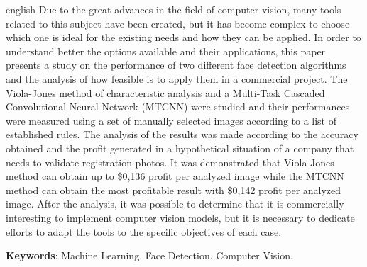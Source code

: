 \begin{resumo}[Abstract]
  \begin{otherlanguage*}{english}
    Due to the great advances in the field of computer vision, many tools related to this subject have been created, but it has become complex to choose which one is ideal for the existing needs and how they can be applied. In order to understand better the options available and their applications, this paper presents a study on the performance of two different face detection algorithms and the analysis of how feasible is to apply them in a commercial project. The Viola-Jones method of characteristic analysis and a Multi-Task Cascaded Convolutional Neural Network (MTCNN) were studied and their performances were measured using a set of manually selected images according to a list of established rules. The analysis of the results was made according to the accuracy obtained and the profit generated in a hypothetical situation of a company that needs to validate registration photos. It was demonstrated that Viola-Jones method can obtain up to \$0,136 profit per analyzed image while the MTCNN method can obtain the most profitable result with \$0,142 profit per analyzed image. After the analysis, it was possible to determine that it is commercially interesting to implement computer vision models, but it is necessary to dedicate efforts to adapt the tools to the specific objectives of each case.

    \vspace{\onelineskip}

    \noindent
    \textbf{Keywords}: Machine Learning. Face Detection. Computer Vision.
  \end{otherlanguage*}
\end{resumo}